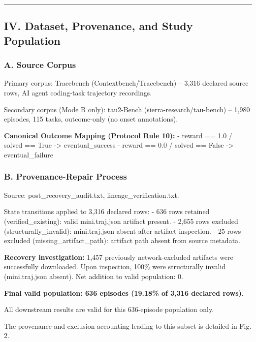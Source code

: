 \documentclass[
]{article}
\begin{document}
\begin{center}\rule{0.5\linewidth}{0.5pt}\end{center}

\subsection{IV. Dataset, Provenance, and Study
Population}\label{iv.-dataset-provenance-and-study-population}

\subsubsection{A. Source Corpus}\label{a.-source-corpus}

Primary corpus: Tracebench (Contextbench/Tracebench) -- 3,316 declared
source rows, AI agent coding-task trajectory recordings.

Secondary corpus (Mode B only): tau2-Bench (sierra-research/tau-bench)
-- 1,980 episodes, 115 tasks, outcome-only (no onset annotations).

\textbf{Canonical Outcome Mapping (Protocol Rule 10):} - reward == 1.0 /
solved == True -\textgreater{} eventual\_success - reward == 0.0 /
solved == False -\textgreater{} eventual\_failure

\subsubsection{B. Provenance-Repair
Process}\label{b.-provenance-repair-process}

Source: post\_recovery\_audit.txt, lineage\_verification.txt.

State transitions applied to 3,316 declared rows: - 636 rows retained
(verified\_existing): valid mini.traj.json artifact present. - 2,655
rows excluded (structurally\_invalid): mini.traj.json absent after
artifact inspection. - 25 rows excluded (missing\_artifact\_path):
artifact path absent from source metadata.

\textbf{Recovery investigation:} 1,457 previously network-excluded
artifacts were successfully downloaded. Upon inspection, 100\% were
structurally invalid (mini.traj.json absent). Net addition to valid
population: 0.

\textbf{Final valid population: 636 episodes (19.18\% of 3,316 declared
rows).}

All downstream results are valid for this 636-episode population only.

The provenance and exclusion accounting leading to this subset is
detailed in Fig. 2.
\end{document}

